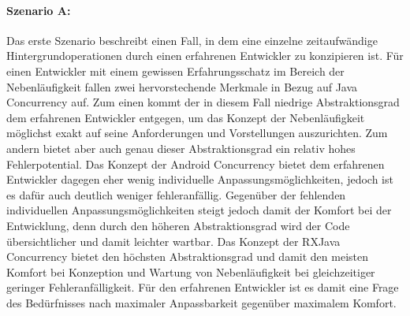 \documentclass[12pt,oneside,a4paper,bibtotoc,liststotoc]{scrreprt}
\begin{document}
\paragraph{Szenario A:}
Das erste Szenario beschreibt einen Fall, in dem eine einzelne zeitaufwändige Hintergrundoperationen durch einen erfahrenen Entwickler zu konzipieren ist. Für einen Entwickler mit einem gewissen Erfahrungsschatz im Bereich der Nebenläufigkeit fallen zwei hervorstechende Merkmale in Bezug auf Java Concurrency auf. Zum einen kommt der in diesem Fall niedrige Abstraktionsgrad dem erfahrenen Entwickler entgegen, um das Konzept der Nebenläufigkeit möglichst exakt auf seine Anforderungen und Vorstellungen auszurichten. Zum andern bietet aber auch genau dieser Abstraktionsgrad ein relativ hohes Fehlerpotential.
Das Konzept der Android Concurrency bietet dem erfahrenen Entwickler dagegen eher wenig individuelle Anpassungsmöglichkeiten, jedoch ist es dafür auch deutlich weniger fehleranfällig. Gegenüber der fehlenden individuellen Anpassungsmöglichkeiten steigt jedoch damit der Komfort bei der Entwicklung, denn durch den höheren Abstraktionsgrad wird der Code übersichtlicher und damit leichter wartbar.
Das Konzept der RXJava Concurrency bietet den höchsten Abstraktionsgrad und damit den meisten Komfort bei Konzeption und Wartung von Nebenläufigkeit bei gleichzeitiger geringer Fehleranfälligkeit.
Für den erfahrenen Entwickler ist es damit eine Frage des Bedürfnisses nach maximaler Anpassbarkeit gegenüber maximalem Komfort.
\end{document}
